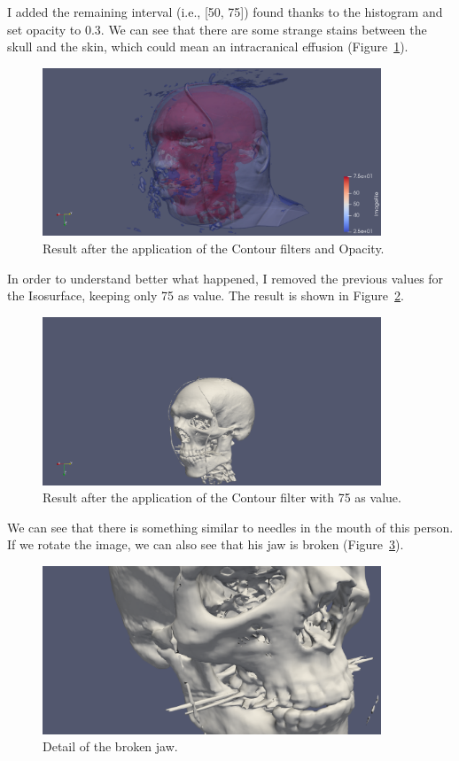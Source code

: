 \documentclass[a4paper]{article}
\begin{document}
I added the remaining interval (i.e., [50, 75]) found thanks to the histogram and set opacity to 0.3. We can see that there are some strange stains between the skull and the skin, which could mean an intracranical effusion (Figure~\ref{img:face_opacity}). 

\begin{figure}[htbp]
\centering
\includegraphics[width=0.9\textwidth]{res/opacity.png}
\caption{Result after the application of the Contour filters and Opacity.}
\label{img:face_opacity}
\end{figure}

In order to understand better what happened, I removed the previous values for the Isosurface, keeping only 75 as value. The result is shown in Figure~\ref{img:skull}.

\begin{figure}[htbp]
\centering
\includegraphics[width=0.9\textwidth]{res/skull.png}
\caption{Result after the application of the Contour filter with 75 as value.}
\label{img:skull}
\end{figure}

We can see that there is something similar to needles in the mouth of this person. If we rotate the image, we can also see that his jaw is broken (Figure~\ref{img:broken}).

\begin{figure}[htbp]
\centering
\includegraphics[width=0.9\textwidth]{res/broken.png}
\caption{Detail of the broken jaw.}
\label{img:broken}
\end{figure}
\end{document}
